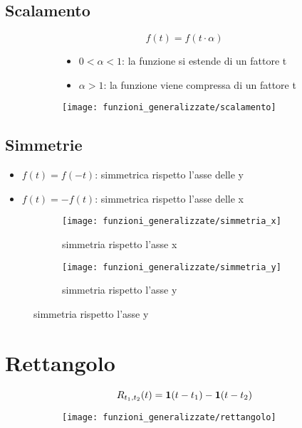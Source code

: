 \documentclass[../main.tex]{subfiles}
\begin{document}
	\subsection{Scalamento}
		\begin{figure}[H]
			\centering
			\begin{subfigure}{0.5\textwidth}
				\[
					f(t) = f(t \cdot \alpha)
				\]
				\begin{itemize}
					\item $ 0 < \alpha < 1 $: la funzione si estende di un fattore t
					\item $ \alpha > 1 $: la funzione viene compressa di un fattore t  
				\end{itemize}
			\end{subfigure}
			\begin{subfigure}{0.4\textwidth}
				\texttt{[image: funzioni\_generalizzate/scalamento]}
			\end{subfigure}
		\end{figure}
		
	\subsection{Simmetrie}
		\begin{itemize}
			\item $ f(t) = f(-t) $: simmetrica rispetto l'asse delle y
			\item $ f(t) = -f(t) $: simmetrica rispetto l'asse delle x  	
		\end{itemize}
		\begin{figure}[H]
			\centering
			\begin{subfigure}{0.45\textwidth}
				\texttt{[image: funzioni\_generalizzate/simmetria\_x]}
				\caption{simmetria rispetto l'asse x}
			\end{subfigure}
			\begin{subfigure}{0.45\textwidth}
				\texttt{[image: funzioni\_generalizzate/simmetria\_y]}
				\caption{simmetria rispetto l'asse y}
			\end{subfigure}
		\end{figure}
		
	\section{Rettangolo}
		\begin{figure}[H]
			\centering
			\begin{subfigure}{0.5\textwidth}
				\[
					R_{t_{1},t_{2}}(t) = \gr[t - t_{1}] - \gr[t - t_{2}]
				\]
			\end{subfigure}
			\begin{subfigure}{0.4\textwidth}
				\texttt{[image: funzioni\_generalizzate/rettangolo]}
			\end{subfigure}
		\end{figure}
		
\end{document}
